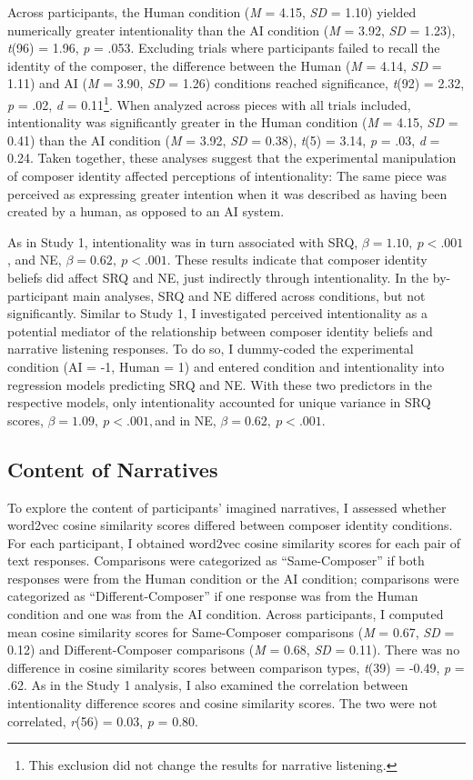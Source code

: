 \documentclass[12pt,twoside]{reedthesis}
\begin{document}
Across participants, the Human condition (\emph{M} = 4.15, \emph{SD} = 1.10) yielded numerically greater intentionality than the AI condition (\emph{M} = 3.92, \emph{SD} = 1.23), \emph{t}(96) = 1.96, \emph{p} = .053. Excluding trials where participants failed to recall the identity of the composer, the difference between the Human (\emph{M} = 4.14, \emph{SD} = 1.11) and AI (\emph{M} = 3.90, \emph{SD} = 1.26) conditions reached significance, \emph{t}(92) = 2.32, \emph{p} = .02, \emph{d} = 0.11\footnote{This exclusion did not change the results for narrative listening.}. When analyzed across pieces with all trials included, intentionality was significantly greater in the Human condition (\emph{M} = 4.15, \emph{SD}  = 0.41) than the AI condition (\emph{M} = 3.92, \emph{SD} = 0.38), \emph{t}(5) = 3.14, \emph{p} = .03, \emph{d} = 0.24. Taken together, these analyses suggest that the experimental manipulation of composer identity affected perceptions of intentionality: The same piece was perceived as expressing greater intention when it was described as having been created by a human, as opposed to an AI system. 

As in Study 1, intentionality was in turn associated with SRQ, $\beta = 1.10, \:p < .001$, and NE, $ \beta = 0.62, \:p < .001$. These results indicate that composer identity beliefs did affect SRQ and NE, just indirectly through intentionality.
In the by-participant main analyses, SRQ and NE differed across conditions, but not significantly. Similar to Study 1, I investigated perceived intentionality as a potential mediator of the relationship between composer identity beliefs and narrative listening responses. To do so, I dummy-coded the experimental condition (AI = -1, Human = 1) and entered condition and intentionality into regression models predicting SRQ and NE. With these two predictors in the respective models, only intentionality accounted for unique variance in SRQ scores, $\beta = 1.09, \:p < .001, $and in NE, $ \beta = 0.62, \:p < .001$. 

\subsection*{Content of Narratives}
To explore the content of participants’ imagined narratives, I assessed whether word2vec cosine similarity scores differed between composer identity conditions. For each participant, I obtained word2vec cosine similarity scores for each pair of text responses. Comparisons were categorized as “Same-Composer” if both responses were from the Human condition or the AI condition; comparisons were categorized as “Different-Composer” if one response was from the Human condition and one was from the AI condition. Across participants, I computed mean cosine similarity scores for Same-Composer comparisons (\emph{M} = 0.67, \emph{SD} = 0.12) and Different-Composer comparisons (\emph{M} = 0.68, \emph{SD} = 0.11). There was no difference in cosine similarity scores between comparison types, \emph{t}(39) = -0.49, \emph{p} = .62. As in the Study 1 analysis, I also examined the correlation between intentionality difference scores and cosine similarity scores. The two were not correlated, \emph{r}(56) = 0.03, \emph{p} = 0.80.
\end{document}
